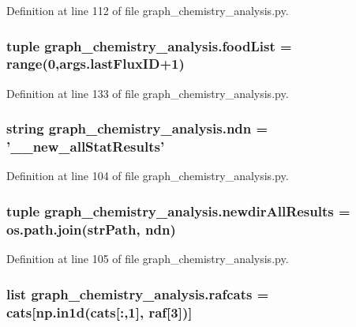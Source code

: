 Definition at line 112 of file graph\-\_\-chemistry\-\_\-analysis.\-py.

\hypertarget{a00103_a4001c4b7597550cda360d67d35c39d8e}{
\subsubsection[{food\-List}]{\setlength{\rightskip}{0pt plus 5cm}tuple graph\-\_\-chemistry\-\_\-analysis.\-food\-List = range(0,args.\-last\-Flux\-I\-D+1)}}\label{a00103_a4001c4b7597550cda360d67d35c39d8e}


Definition at line 133 of file graph\-\_\-chemistry\-\_\-analysis.\-py.

\hypertarget{a00103_a47102719cd6e664cce6fa7202e3982b1}{
\subsubsection[{ndn}]{\setlength{\rightskip}{0pt plus 5cm}string graph\-\_\-chemistry\-\_\-analysis.\-ndn = '\-\_\-\_\-new\-\_\-all\-Stat\-Results'}}\label{a00103_a47102719cd6e664cce6fa7202e3982b1}


Definition at line 104 of file graph\-\_\-chemistry\-\_\-analysis.\-py.

\hypertarget{a00103_a4e302e188faffc99286c6c7b38cbf1f8}{
\subsubsection[{newdir\-All\-Results}]{\setlength{\rightskip}{0pt plus 5cm}tuple graph\-\_\-chemistry\-\_\-analysis.\-newdir\-All\-Results = os.\-path.\-join({\bf str\-Path}, {\bf ndn})}}\label{a00103_a4e302e188faffc99286c6c7b38cbf1f8}


Definition at line 105 of file graph\-\_\-chemistry\-\_\-analysis.\-py.

\hypertarget{a00103_a31989d0bc1095d20a17527f6f7913c81}{
\subsubsection[{rafcats}]{\setlength{\rightskip}{0pt plus 5cm}list graph\-\_\-chemistry\-\_\-analysis.\-rafcats = {\bf cats}\mbox{[}np.\-in1d({\bf cats}\mbox{[}\-:,1\mbox{]}, raf\mbox{[}3\mbox{]})\mbox{]}}}\label{a00103_a31989d0bc1095d20a17527f6f7913c81}


